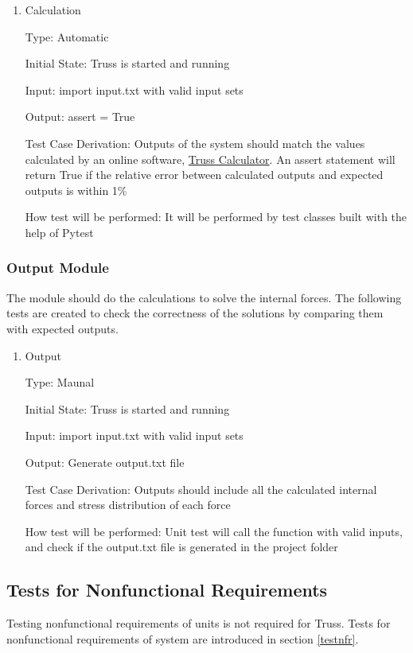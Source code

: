\documentclass[12pt, titlepage]{article}
\begin{document}
\begin{enumerate}
	
	\item{Calculation\\}
	
	Type: Automatic
	
	Initial State: Truss is started and running
	
	Input: import input.txt with valid input sets
	
	Output: assert = True
	
	Test Case Derivation: Outputs of the system should match the values 
	calculated by an online software, 
	\href{https://skyciv.com/free-truss-calculator/}{Truss 
	Calculator}. An assert statement will return True if the relative error 
	between calculated outputs and expected outputs is within 1\%
	
	How test will be performed: It will be performed by test classes built with 
	the help of Pytest
	
\end{enumerate}

\subsubsection{Output Module} \label{output}
The module should do the calculations to solve the internal forces. The 
following tests are created to check the correctness of the solutions by 
comparing them with expected outputs. 

\begin{enumerate}
	
	\item{Output\\}
	
	Type: Maunal
	
	Initial State: Truss is started and running
	
	Input: import input.txt with valid input sets
	
	Output: Generate output.txt file 
	
	Test Case Derivation: Outputs should include all the calculated internal 
	forces and stress distribution of each force
	
	How test will be performed: Unit test will call the function with valid
	inputs, and check if the output.txt file is generated in the project folder
	
\end{enumerate}

\subsection{Tests for Nonfunctional Requirements}
Testing nonfunctional requirements of units is not required for Truss. Tests 
for nonfunctional requirements of system are introduced in section 
\ref{testnfr}.
\end{document}
